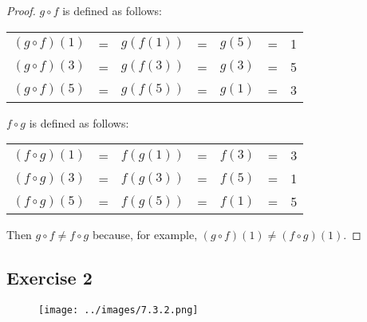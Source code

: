 \documentclass[14pt]{extarticle}
\begin{document}
\begin{proof}
    \(g \circ f\) is defined as follows:
    \begin{center}
        \begin{tabular}{ccccccc}
            \((g \circ f)(1)\) & = & \(g(f(1))\) & = & \(g(5)\) & = & 1 \\
            \((g \circ f)(3)\) & = & \(g(f(3))\) & = & \(g(3)\) & = & 5 \\
            \((g \circ f)(5)\) & = & \(g(f(5))\) & = & \(g(1)\) & = & 3 \\
        \end{tabular}
    \end{center}

    \(f \circ g\) is defined as follows:
    \begin{center}
        \begin{tabular}{ccccccc}
            \((f \circ g)(1)\) & = & \(f(g(1))\) & = & \(f(3)\) & = & 3 \\
            \((f \circ g)(3)\) & = & \(f(g(3))\) & = & \(f(5)\) & = & 1 \\
            \((f \circ g)(5)\) & = & \(f(g(5))\) & = & \(f(1)\) & = & 5 \\
        \end{tabular}
    \end{center}

    Then \(g \circ f \neq f \circ g\) because, for example, \((g \circ f)(1) \neq (f \circ g)(1)\).
\end{proof}

\subsection{Exercise 2}
\begin{figure}[ht!]
    \centering
    \texttt{[image: ../images/7.3.2.png]}
\end{figure}
\end{document}
